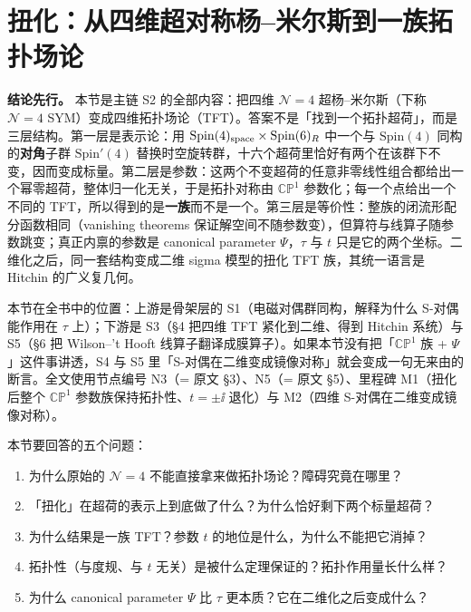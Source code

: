
\section{扭化：从四维超对称杨--米尔斯到一族拓扑场论}

\noindent
\textbf{结论先行。} 本节是主链 S2 的全部内容：把四维 $\mathcal N=4$ 超杨--米尔斯（下称 $\mathcal N=4$ SYM）变成四维拓扑场论（TFT）。答案不是「找到一个拓扑超荷」，而是三层结构。第一层是表示论：用 $\mathrm{Spin}(4)_{\rm space}\times\mathrm{Spin}(6)_R$ 中一个与 $\mathrm{Spin}(4)$ 同构的\textbf{对角}子群 $\mathrm{Spin}'(4)$ 替换时空旋转群，十六个超荷里恰好有两个在该群下不变，因而变成标量。第二层是参数：这两个不变超荷的任意非零线性组合都给出一个幂零超荷，整体归一化无关，于是拓扑对称由 $\mathbb{CP}^1$ 参数化；每一个点给出一个不同的 TFT，所以得到的是\textbf{一族}而不是一个。第三层是等价性：整族的闭流形配分函数相同（vanishing theorems 保证解空间不随参数变），但算符与线算子随参数跳变；真正内禀的参数是 canonical parameter $\Psi$，$\tau$ 与 $t$ 只是它的两个坐标。二维化之后，同一套结构变成二维 sigma 模型的扭化 TFT 族，其统一语言是 Hitchin 的广义复几何\pA{}。

本节在全书中的位置：上游是骨架层的 S1（电磁对偶群同构，解释为什么 S-对偶能作用在 $\tau$ 上）；下游是 S3（§4 把四维 TFT 紧化到二维、得到 Hitchin 系统）与 S5（§6 把 Wilson--'t Hooft 线算子翻译成膜算子）。如果本节没有把「$\mathbb{CP}^1$ 族 + $\Psi$」这件事讲透，S4 与 S5 里「S-对偶在二维变成镜像对称」就会变成一句无来由的断言。全文使用节点编号 N3（= 原文 §3）、N5（= 原文 §5）、里程碑 M1（扭化后整个 $\mathbb{CP}^1$ 参数族保持拓扑性、$t=\pm\ii$ 退化）与 M2（四维 S-对偶在二维变成镜像对称）\pC{}。

本节要回答的五个问题：
\begin{enumerate}[label=(\roman*)]
\item 为什么原始的 $\mathcal N=4$ 不能直接拿来做拓扑场论？障碍究竟在哪里？
\item 「扭化」在超荷的表示上到底做了什么？为什么恰好剩下两个标量超荷？
\item 为什么结果是一族 TFT？参数 $t$ 的地位是什么，为什么不能把它消掉？
\item 拓扑性（与度规、与 $t$ 无关）是被什么定理保证的？拓扑作用量长什么样？
\item 为什么 canonical parameter $\Psi$ 比 $\tau$ 更本质？它在二维化之后变成什么？
\end{enumerate}

